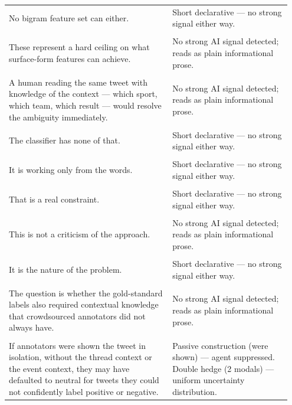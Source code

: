 \documentclass[11pt]{article}
\begin{document}
\begin{longtable}{|p{0.55\linewidth}|p{0.40\linewidth}|}
\hline
\rule{0pt}{3.5cm} & \\
\hline
No bigram feature set can either. & Short declarative --- no strong signal either way. \\[2pt]
\hline
\rule{0pt}{3.5cm} & \\
\hline
These represent a hard ceiling on what surface-form features can achieve. & No strong AI signal detected; reads as plain informational prose. \\[2pt]
\hline
\rule{0pt}{3.5cm} & \\
\hline
A human reading the same tweet with knowledge of the context --- which sport, which team, which result --- would resolve the ambiguity immediately. & No strong AI signal detected; reads as plain informational prose. \\[2pt]
\hline
\rule{0pt}{3.5cm} & \\
\hline
The classifier has none of that. & Short declarative --- no strong signal either way. \\[2pt]
\hline
\rule{0pt}{3.5cm} & \\
\hline
It is working only from the words. & Short declarative --- no strong signal either way. \\[2pt]
\hline
\rule{0pt}{3.5cm} & \\
\hline
That is a real constraint. & Short declarative --- no strong signal either way. \\[2pt]
\hline
\rule{0pt}{3.5cm} & \\
\hline
This is not a criticism of the approach. & No strong AI signal detected; reads as plain informational prose. \\[2pt]
\hline
\rule{0pt}{3.5cm} & \\
\hline
It is the nature of the problem. & Short declarative --- no strong signal either way. \\[2pt]
\hline
\rule{0pt}{3.5cm} & \\
\hline
The question is whether the gold-standard labels also required contextual knowledge that crowdsourced annotators did not always have. & No strong AI signal detected; reads as plain informational prose. \\[2pt]
\hline
\rule{0pt}{3.5cm} & \\
\hline
If annotators were shown the tweet in isolation, without the thread context or the event context, they may have defaulted to neutral for tweets they could not confidently label positive or negative. & Passive construction (were shown) --- agent suppressed. Double hedge (2 modals) --- uniform uncertainty distribution. \\[2pt]

\end{longtable}
\end{document}
